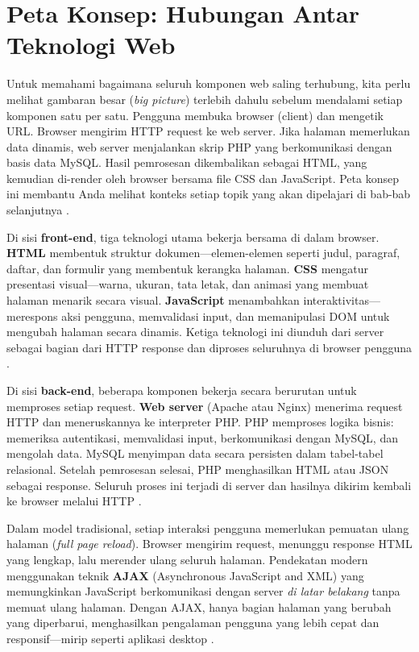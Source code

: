 ﻿\section{Peta Konsep: Hubungan Antar Teknologi Web}
Untuk memahami bagaimana seluruh komponen web saling terhubung, kita perlu melihat gambaran besar (\textit{big picture}) terlebih dahulu sebelum mendalami setiap komponen satu per satu. Pengguna membuka browser (client) dan mengetik URL. Browser mengirim HTTP request ke web server. Jika halaman memerlukan data dinamis, web server menjalankan skrip PHP yang berkomunikasi dengan basis data MySQL. Hasil pemrosesan dikembalikan sebagai HTML, yang kemudian di-render oleh browser bersama file CSS dan JavaScript. Peta konsep ini membantu Anda melihat konteks setiap topik yang akan dipelajari di bab-bab selanjutnya \cite{mdnLearn}.

Di sisi \textbf{front-end}, tiga teknologi utama bekerja bersama di dalam browser. \textbf{HTML} membentuk struktur dokumen---elemen-elemen seperti judul, paragraf, daftar, dan formulir yang membentuk kerangka halaman. \textbf{CSS} mengatur presentasi visual---warna, ukuran, tata letak, dan animasi yang membuat halaman menarik secara visual. \textbf{JavaScript} menambahkan interaktivitas---merespons aksi pengguna, memvalidasi input, dan memanipulasi DOM untuk mengubah halaman secara dinamis. Ketiga teknologi ini diunduh dari server sebagai bagian dari HTTP response dan diproses seluruhnya di browser pengguna \cite{mdnJsGuide}.

Di sisi \textbf{back-end}, beberapa komponen bekerja secara berurutan untuk memproses setiap request. \textbf{Web server} (Apache atau Nginx) menerima request HTTP dan meneruskannya ke interpreter PHP. PHP memproses logika bisnis: memeriksa autentikasi, memvalidasi input, berkomunikasi dengan MySQL, dan mengolah data. MySQL menyimpan data secara persisten dalam tabel-tabel relasional. Setelah pemrosesan selesai, PHP menghasilkan HTML atau JSON sebagai response. Seluruh proses ini terjadi di server dan hasilnya dikirim kembali ke browser melalui HTTP \cite{phpManual}.

Dalam model tradisional, setiap interaksi pengguna memerlukan pemuatan ulang halaman (\textit{full page reload}). Browser mengirim request, menunggu response HTML yang lengkap, lalu merender ulang seluruh halaman. Pendekatan modern menggunakan teknik \textbf{AJAX} (Asynchronous JavaScript and XML) yang memungkinkan JavaScript berkomunikasi dengan server \textit{di latar belakang} tanpa memuat ulang halaman. Dengan AJAX, hanya bagian halaman yang berubah yang diperbarui, menghasilkan pengalaman pengguna yang lebih cepat dan responsif---mirip seperti aplikasi desktop \cite{webdevLearn}.

